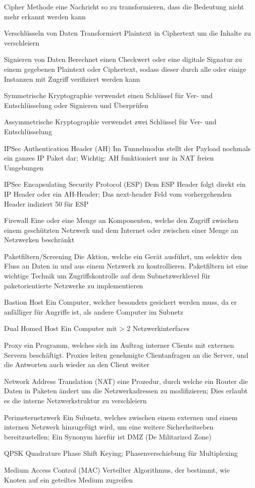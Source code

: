 \documentclass[10pt,landscape]{article}
\begin{document}
\begin{multicols}{3}
\begin{description*}
        \item[Cipher] Methode eine Nachricht so zu transformieren, dass die Bedeutung nicht mehr erkannt werden kann
        \item[Verschlüsseln von Daten] Transformiert Plaintext in Ciphertext um die Inhalte zu verschleiern
        \item[Signieren von Daten] Berechnet einen Checkwert oder eine digitale Signatur zu einem gegebenen Plaintext oder Ciphertext, sodass dieser durch alle oder einige Instanzen mit Zugriff verifiziert werden kann
        \item[Symmetrische Kryptographie] verwendet einen Schlüssel für Ver- und Entschlüsselung oder Signieren und Überprüfen
        \item[Assymmetrische Kryptographie] verwendet zwei Schlüssel für Ver- und Entschlüsselung
        \item[IPSec Authentication Header (AH)] Im Tunnelmodus stellt der Payload nochmals ein ganzes IP Paket dar; Wichtig: AH funktioniert nur in NAT freien Umgebungen
        \item[IPSec Encapsulating Security Protocol (ESP)] Dem ESP Header folgt direkt ein IP Header oder ein AH-Header; Das next-header Feld vom vorhergehenden Header indiziert 50 für ESP
        \item[Firewall] Eine oder eine Menge an Komponenten, welche den Zugriff zwischen einem geschützten Netzwerk und dem Internet oder zwischen einer Menge an Netzwerken beschränkt
        \item[Paketfiltern/Screening] Die Aktion, welche ein Gerät ausführt, um selektiv den Fluss an Daten in und aus einem Netzwerk zu kontrollieren. Paketfiltern ist eine wichtige Technik um Zugriffskontrolle auf dem Subnetzwerklevel für paketorientierte Netzwerke zu implementieren
        \item[Bastion Host] Ein Computer, welcher besonders gesichert werden muss, da er anfälliger für Angriffe ist, als andere Computer im Subnetz
        \item[Dual Homed Host] Ein Computer mit > 2 Netzwerkinterfaces
        \item[Proxy] ein Programm, welches sich im Auftrag interner Clients mit externen Servern beschäftigt. Proxies leiten genehmigte Clientanfragen an die Server, und die Antworten auch wieder an den Client weiter
        \item[Network Address Translation (NAT)] eine Prozedur, durch welche ein Router die Daten in Paketen ändert um die Netzwerkadressen zu modifizieren; Dies erlaubt es die interne Netzwerkstruktur zu verschleiern
        \item[Perimeternetzwerk] Ein Subnetz, welches zwischen einem externen und einem internen Netzwerk hinzugefügt wird, um eine weitere Sicherheitseben bereitzustellen; Ein Synonym hierfür ist DMZ (De Militarized Zone)
        \item[QPSK] Quadrature Phase Shift Keying; Phasenverschiebung für Multiplexing
        \item[Medium Access Control (MAC)] Verteilter Algorithmus, der bestimmt, wie Knoten auf ein geteiltes Medium zugreifen
    \end{description*}
    

\end{multicols}
\end{document}
